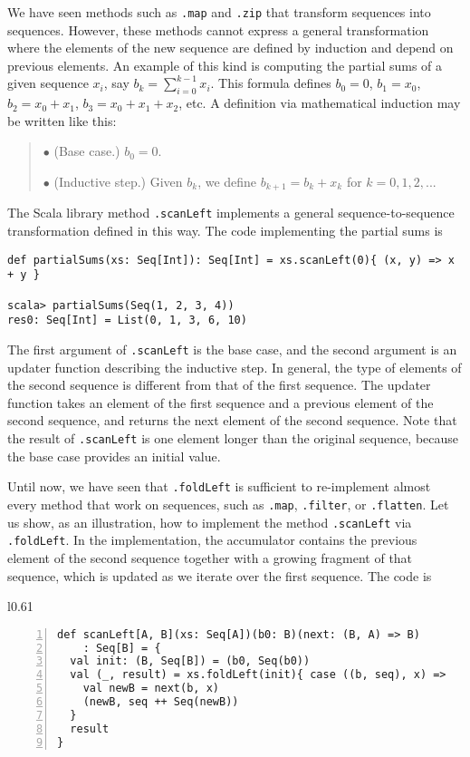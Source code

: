 We have seen methods such as \lstinline!.map! and \lstinline!.zip!
that transform sequences into sequences. However, these methods cannot
express a general transformation where the elements of the new sequence
are defined by induction and depend on previous elements. An example
of this kind is computing the partial sums of a given sequence $x_{i}$,
say $b_{k}=\sum_{i=0}^{k-1}x_{i}$. This formula defines $b_{0}=0$,
$b_{1}=x_{0}$, $b_{2}=x_{0}+x_{1}$, $b_{3}=x_{0}+x_{1}+x_{2}$,
etc. A definition via mathematical induction may be written like this:
\begin{quotation}
$\bullet$ (Base case.) $b_{0}=0$.

$\bullet$ (Inductive step.) Given $b_{k}$, we define $b_{k+1}=b_{k}+x_{k}$
for $k=0,1,2,...$
\end{quotation}
The Scala library method \lstinline!.scanLeft! implements a general
sequence-to-sequence transformation defined in this way. The code
implementing the partial sums is
\begin{lstlisting}
def partialSums(xs: Seq[Int]): Seq[Int] = xs.scanLeft(0){ (x, y) => x + y }

scala> partialSums(Seq(1, 2, 3, 4))
res0: Seq[Int] = List(0, 1, 3, 6, 10)
\end{lstlisting}
The first argument of \lstinline!.scanLeft! is the base case, and
the second argument is an updater function describing the inductive
step. In general, the type of elements of the second sequence is different
from that of the first sequence. The updater function takes an element
of the first sequence and a previous element of the second sequence,
and returns the next element of the second sequence. Note that the
result of \lstinline!.scanLeft! is one element longer than the original
sequence, because the base case provides an initial value.

Until now, we have seen that \lstinline!.foldLeft! is sufficient
to re-implement almost every method that work on sequences, such as
\lstinline!.map!, \lstinline!.filter!, or \lstinline!.flatten!.
Let us show, as an illustration, how to implement the method \lstinline!.scanLeft!
via \lstinline!.foldLeft!. In the implementation, the accumulator
contains the previous element of the second sequence together with
a growing fragment of that sequence, which is updated as we iterate
over the first sequence. The code is

\begin{wrapfigure}{l}{0.61\columnwidth}%
\vspace{-0.95\baselineskip}
\begin{lstlisting}[numbers=left]
def scanLeft[A, B](xs: Seq[A])(b0: B)(next: (B, A) => B)
    : Seq[B] = {
  val init: (B, Seq[B]) = (b0, Seq(b0))
  val (_, result) = xs.foldLeft(init){ case ((b, seq), x) =>
    val newB = next(b, x)
    (newB, seq ++ Seq(newB))
  }
  result
}
\end{lstlisting}

\vspace{-1.2\baselineskip}
\end{wrapfigure}%

